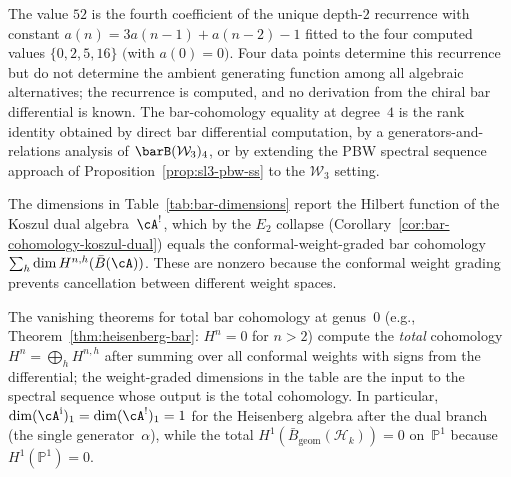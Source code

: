 \begin{remark}[Finite recurrence reading of \texorpdfstring{$H^4(\mathcal{W}_3) = 52$}{H4(W3) = 52}]
\label{rem:w3-h4-recurrence}
The value $52$ is the fourth coefficient of the unique depth-$2$
recurrence with constant $a(n) = 3a(n{-}1) + a(n{-}2) - 1$
fitted to the four computed values $\{0, 2, 5, 16\}$
$($with $a(0)=0)$.
Four data points determine this recurrence but do not determine the
ambient generating function among all algebraic alternatives; the
recurrence is computed, and no derivation from the chiral bar
differential is known.  The
bar-cohomology equality at degree~$4$ is the rank identity obtained by
direct bar differential computation, by a generators-and-relations
analysis of
$\barB(\mathcal{W}_3)_4$, or by extending the PBW spectral sequence
approach of Proposition~\ref{prop:sl3-pbw-ss} to the $\mathcal{W}_3$
setting.
\end{remark}

\begin{remark}\label{rem:table-vs-vanishing}
The dimensions in Table~\ref{tab:bar-dimensions} report the
Hilbert function of the Koszul dual algebra~$\cA^!$, which by the
$E_2$ collapse (Corollary~\ref{cor:bar-cohomology-koszul-dual})
equals the conformal-weight-graded bar cohomology
$\sum_h \dim H^{n,h}(\bar{B}(\cA))$.
These are nonzero because the conformal weight grading
prevents cancellation between different weight spaces.

The vanishing theorems for total bar cohomology at genus~$0$
(e.g., Theorem~\ref{thm:heisenberg-bar}: $H^n = 0$ for $n > 2$)
compute the \emph{total} cohomology $H^n = \bigoplus_h H^{n,h}$
after summing over all conformal weights with signs from the
differential; the weight-graded dimensions in the table are the
input to the spectral sequence whose output is the total
cohomology. In particular,
$\dim(\cA^{\mathrm i})_1=\dim(\cA^!)_1 = 1$ for the
Heisenberg algebra after the dual branch (the single
generator~$\alpha$), while the
total $H^1(\bar{B}_{\mathrm{geom}}(\mathcal{H}_k)) = 0$
on~$\mathbb{P}^1$ because $H^1(\mathbb{P}^1) = 0$.
\end{remark}

